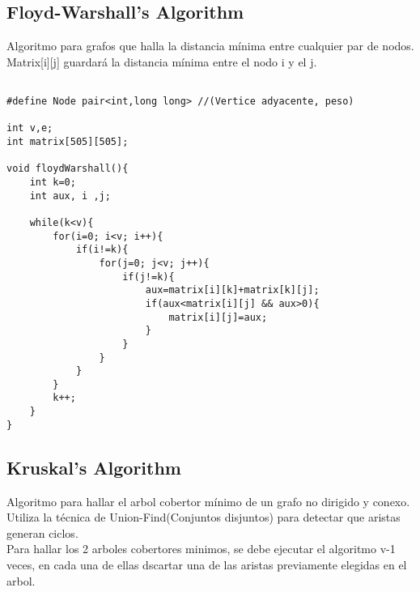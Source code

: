 \documentclass[11pt,letterpaper,twocolumn,twosided]{article}
\begin{document}
\subsection{Floyd-Warshall's Algorithm}
Algoritmo para grafos que halla la distancia m\'inima entre cualquier par de nodos. Matrix[i][j] guardar\'a la distancia m\'inima entre el nodo i y el j.

\begin{lstlisting}

#define Node pair<int,long long> //(Vertice adyacente, peso)

int v,e;
int matrix[505][505];

void floydWarshall(){
    int k=0;
    int aux, i ,j;
    
    while(k<v){
        for(i=0; i<v; i++){
            if(i!=k){
                for(j=0; j<v; j++){
                    if(j!=k){
                        aux=matrix[i][k]+matrix[k][j];
                        if(aux<matrix[i][j] && aux>0){ 
                            matrix[i][j]=aux;
                        }
                    }
                }
            }
        }
        k++;
    }
}\end{lstlisting}

\subsection{Kruskal's Algorithm}
Algoritmo para hallar el arbol cobertor m\'inimo de un grafo  no dirigido y conexo. Utiliza la t\'ecnica de Union-Find(Conjuntos disjuntos) para detectar que aristas generan ciclos.\\
Para hallar los 2 arboles cobertores minimos, se debe ejecutar el algoritmo v-1 veces, en cada una de ellas dscartar una de las aristas previamente elegidas en el arbol.
\end{document}
